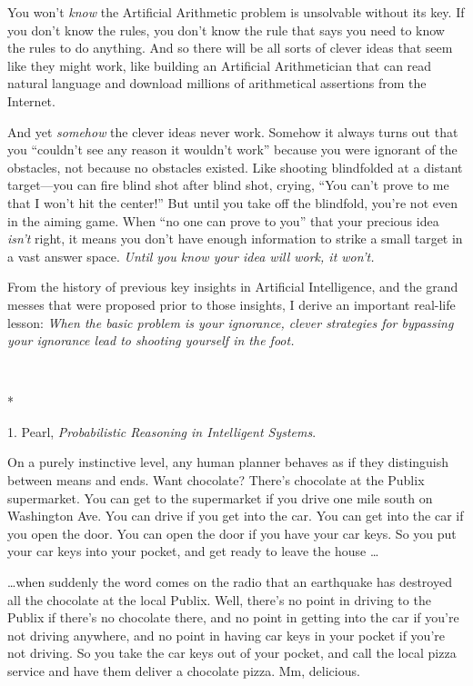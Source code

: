 {
 You won't \textit{know} the Artificial Arithmetic
problem is unsolvable without its key. If you don't
know the rules, you don't know the rule that says you
need to know the rules to do anything. And so there will be all sorts
of clever ideas that seem like they might work, like building an
Artificial Arithmetician that can read natural language and download
millions of arithmetical assertions from the Internet.}

{
 And yet \textit{somehow} the clever ideas never work. Somehow it
always turns out that you ``couldn't
see any reason it wouldn't work''
because you were ignorant of the obstacles, not because no obstacles
existed. Like shooting blindfolded at a distant target---you can fire
blind shot after blind shot, crying, ``You
can't prove to me that I won't hit the
center!'' But until you take off the blindfold,
you're not even in the aiming game. When
``no one can prove to you'' that
your precious idea \textit{isn't} right, it means you
don't have enough information to strike a small target
in a vast answer space. \textit{Until you know your idea will work, it
won't.}}

{
 From the history of previous key insights in Artificial
Intelligence, and the grand messes that were proposed prior to those
insights, I derive an important real-life lesson: \textit{When the
basic problem is your ignorance, clever strategies for bypassing your
ignorance lead to shooting yourself in the foot.}}

{\centering
 \ ~
\par}

{\centering
 *
\par}


\bigskip

{
 1. Pearl, \textit{Probabilistic Reasoning in Intelligent
Systems}.}


{
 On a purely instinctive level, any human planner behaves as if
they distinguish between means and ends. Want chocolate?
There's chocolate at the Publix supermarket. You can
get to the supermarket if you drive one mile south on Washington Ave.
You can drive if you get into the car. You can get into the car if you
open the door. You can open the door if you have your car keys. So you
put your car keys into your pocket, and get ready to leave the house
\ldots }

{
 \ldots when suddenly the word comes on the radio that an earthquake
has destroyed all the chocolate at the local Publix. Well,
there's no point in driving to the Publix if
there's no chocolate there, and no point in getting
into the car if you're not driving anywhere, and no
point in having car keys in your pocket if you're not
driving. So you take the car keys out of your pocket, and call the
local pizza service and have them deliver a chocolate pizza. Mm,
delicious.}

